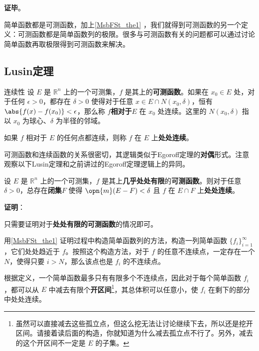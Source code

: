 \textbf{证毕}。

简单函数都是可测函数，加上\autoref{MsbFSt_the1} ，我们就得到可测函数的另一个定义：可测函数都是简单函数列的极限。很多与可测函数有关的问题都可以通过讨论简单函数再取极限得到可测函数来解决。



\subsection{Lusin定理}

\begin{definition}{连续性}\label{MsbFSt_def2}
设 $E$ 是 $\mathbb{R}^n$ 上的一个可测集，$f$ 是其上的\textbf{可测函数}。如果在 $x_0\in E$ 处，对于任何 $\epsilon>0$，都存在 $\delta>0$ 使得对于任意 $x\in E\cap N(x_0, \delta)$，恒有 $\abs{f(x)-f(x_0)}<\epsilon$，那么称 $f$\textbf{相对于}$E$ 在 $x_0$ 处连续。这里的 $N(x_0, \delta)$ 指以 $x_0$ 为球心、$\delta$ 为半径的邻域。

如果 $f$ 相对于 $E$ 的任何点都连续，则称 $f$ 在 $E$ 上\textbf{处处连续}。
\end{definition}

可测函数和连续函数的关系很密切，其逻辑类似于Egoroff定理的\textbf{对偶}形式。注意观察以下Lusin定理和之前讲过的Egoroff定理逻辑上的异同。

\begin{theorem}{}\label{MsbFSt_the2}

设 $E$ 是 $\mathbb{R}^n$ 上的一个可测集，$f$ 是其上\textbf{几乎处处有限}的\textbf{可测函数}。则对于任意 $\delta>0$，总存在\textbf{闭集}$F$ 使得 $\opn{m}(E-F)<\delta$ 且 $f$ 在 $E\cap F$ 上\textbf{处处连续}。

\end{theorem}

\textbf{证明}：

只需要证明对于\textbf{处处有限的可测函数}的情况即可。

用\autoref{MsbFSt_the1}  证明过程中构造简单函数列的方法，构造一列简单函数 $\{f_i\}_{i=1}^\infty$，它们处处趋近于 $f$。按照这个构造方法，对于 $f$ 的任意不连续点，一定存在一个 $N$，使得只要 $i>N$，那么该点也是 $f_i$ 的不连续点。

根据定义，一个简单函数最多只有有限多个不连续点，因此对于每个简单函数 $f_i$，都可以从 $E$ 中减去有限个\textbf{开区间}\footnote{虽然可以直接减去这些孤立点，但这么挖无法让讨论继续下去，所以还是挖开区间。请接着读后面的构造，你就知道为什么减去孤立点不行了。另外，减去的这个开区间不一定是 $E$ 的子集。}，其总体积可以任意小，使 $f_i$ 在剩下的部分中处处连续。

